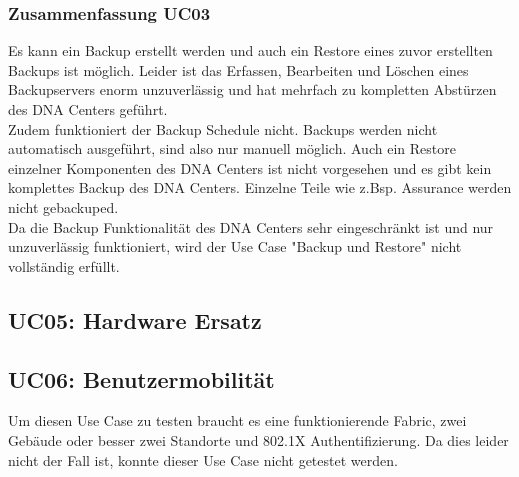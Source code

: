 \begin{landscape}
\subsubsection{Zusammenfassung UC03}
Es kann ein Backup erstellt werden und auch ein Restore eines zuvor erstellten Backups ist möglich. Leider ist das Erfassen, Bearbeiten und Löschen eines Backupservers enorm unzuverlässig und hat mehrfach zu kompletten Abstürzen des DNA Centers geführt. \\
Zudem funktioniert der Backup Schedule nicht. Backups werden nicht automatisch ausgeführt, sind also nur manuell möglich. Auch ein Restore einzelner Komponenten des DNA Centers ist nicht vorgesehen und es gibt kein komplettes Backup des DNA Centers. Einzelne Teile wie z.Bsp. Assurance werden nicht gebackuped. \\
Da die Backup Funktionalität des DNA Centers sehr eingeschränkt ist und nur unzuverlässig funktioniert, wird der Use Case "Backup und Restore" nicht vollständig erfüllt.
\pagebreak

\pagebreak

\subsection{UC05: Hardware Ersatz}


\pagebreak

\subsection{UC06: Benutzermobilität}
Um diesen Use Case zu testen braucht es eine funktionierende Fabric, zwei Gebäude oder besser zwei Standorte und 802.1X Authentifizierung. Da dies leider nicht der Fall ist, konnte dieser Use Case nicht getestet werden. 


\end{landscape}
